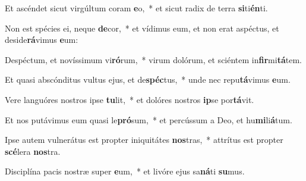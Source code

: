 \item Et ascéndet sicut virgúltum coram \textbf{e}o,~* et sicut radix de terra \textbf{si}ti\textbf{én}ti.
\item Non est spécies ei, neque \textbf{de}cor,~* et vídimus eum, et non erat aspéctus, et deside\textbf{rá}vimus \textbf{e}um:
\item Despéctum, et novíssimum vi\textbf{ró}rum,~* virum dolórum, et sciéntem in\textbf{fir}mi\textbf{tá}tem.
\item Et quasi abscónditus vultus ejus, et de\textbf{spéc}tus,~* unde nec repu\textbf{tá}vimus \textbf{e}um.
\item Vere languóres nostros ipse \textbf{tu}lit,~* et dolóres nostros \textbf{ip}se por\textbf{tá}vit.
\item Et nos putávimus eum quasi le\textbf{pró}sum,~* et percússum a Deo, et hu\textbf{mi}li\textbf{á}tum.
\item Ipse autem vulnerátus est propter iniquitátes \textbf{nos}tras,~* attrítus est propter \textbf{scé}lera \textbf{nos}tra.
\item Disciplína pacis nostræ super \textbf{e}um,~* et livóre ejus sa\textbf{ná}ti \textbf{su}mus.
